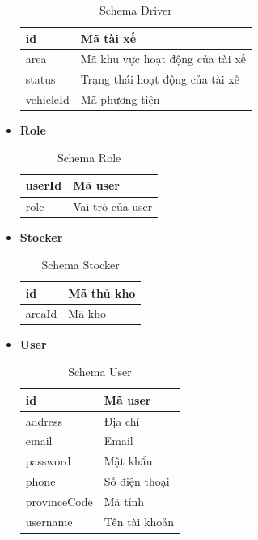 \begin{itemize}
		\begin{table}[!htp]
			\centering\begin{tabular}{|l|m{30em}|}
				\hline 
				id & Mã tài xế\\
				\hline 
				area & Mã khu vực hoạt động của tài xế\\
				\hline 
				status & Trạng thái hoạt động của tài xế\\
				\hline 
				vehicleId & Mã phương tiện\\
				\hline 
			\end{tabular}
			\caption{Schema Driver}
		\end{table}
	
		\item \textbf{Role}
		
		\begin{table}[!htp]
			\centering\begin{tabular}{|l|m{30em}|}
				\hline 
				userId & Mã user\\
				\hline 
				role & Vai trò của user\\
				\hline 
			\end{tabular}
			\caption{Schema Role}
		\end{table}
	
		\item \textbf{Stocker}
		
		\begin{table}[!htp]
			\centering\begin{tabular}{|l|m{30em}|}
				\hline 
				id & Mã thủ kho\\
				\hline 
				areaId & Mã kho\\
				\hline 
			\end{tabular}
			\caption{Schema Stocker}
		\end{table}
	
		\item \textbf{User}
		
		\begin{table}[!htp]
			\centering\begin{tabular}{|l|m{30em}|}
				\hline 
				id & Mã user\\
				\hline 
				address & Địa chỉ\\
				\hline 
				email & Email\\
				\hline 
				password & Mật khẩu\\
				\hline 
				phone & Số điện thoại\\
				\hline 
				provinceCode & Mã tỉnh\\
				\hline 
				username & Tên tài khoản\\
				\hline 
			\end{tabular}
			\caption{Schema User}
		\end{table}
	

\end{itemize}
